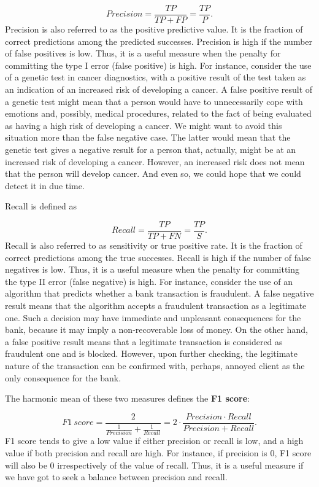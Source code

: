 \documentclass[12pt,]{krantz}
\begin{document}
\[
Precision = \frac{TP}{TP+FP} = \frac{TP}{P}.
\]
Precision is also referred to as the positive predictive value. It is the fraction of correct predictions among the predicted successes. Precision is high if the number of false positives is low. Thus, it is a useful measure when the penalty for committing the type I error (false positive) is high. For instance, consider the use of a genetic test in cancer diagnostics, with a positive result of the test taken as an indication of an increased risk of developing a cancer. A false positive result of a genetic test might mean that a person would have to unnecessarily cope with emotions and, possibly, medical procedures, related to the fact of being evaluated as having a high risk of developing a cancer. We might want to avoid this situation more than the false negative case. The latter would mean that the genetic test gives a negative result for a person that, actually, might be at an increased risk of developing a cancer. However, an increased risk does not mean that the person will develop cancer. And even so, we could hope that we could detect it in due time.

Recall is defined as

\[
Recall = \frac{TP}{TP+FN} = \frac{TP}{S}.
\]
Recall is also referred to as sensitivity or true positive rate. It is the fraction of correct predictions among the true successes. Recall is high if the number of false negatives is low. Thus, it is a useful measure when the penalty for committing the type II error (false negative) is high. For instance, consider the use of an algorithm that predicts whether a bank transaction is fraudulent. A false negative result means that the algorithm accepts a fraudulent transaction as a legitimate one. Such a decision may have immediate and unpleasant consequences for the bank, because it may imply a non-recoverable loss of money. On the other hand, a false positive result means that a legitimate transaction is considered as fraudulent one and is blocked. However, upon further checking, the legitimate nature of the transaction can be confirmed with, perhaps, annoyed client as the only consequence for the bank.

The harmonic mean of these two measures defines the \textbf{F1 score}:

\[
F1\  score = \frac{2}{\frac{1}{Precision} + \frac{1}{Recall}} = 2\cdot\frac{Precision \cdot Recall}{Precision + Recall}.
\]
F1 score tends to give a low value if either precision or recall is low, and a high value if both precision and recall are high. For instance, if precision is 0, F1 score will also be 0 irrespectively of the value of recall. Thus, it is a useful measure if we have got to seek a balance between precision and recall.
\end{document}
